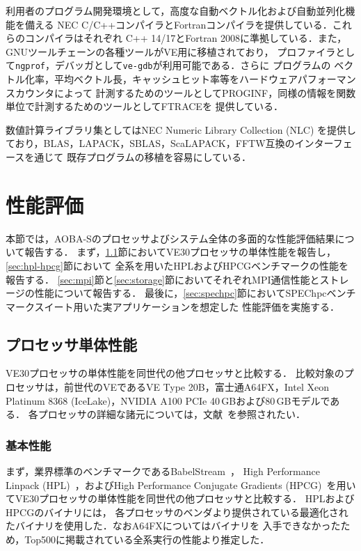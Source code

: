 ﻿\documentclass[submit,techrep,noauthor]{ipsj}
\begin{document}
利用者のプログラム開発環境として，高度な自動ベクトル化および自動並列化機能を備える
NEC C/C++コンパイラとFortranコンパイラを提供している．これらのコンパイラはそれぞれ
C++ 14/17とFortran 2008に準拠している．また，GNUツールチェーンの各種ツールがVE用に移植されており，
プロファイラとして\verb|ngprof|，デバッガとして\verb|ve-gdb|が利用可能である．さらに
プログラムの
ベクトル化率，平均ベクトル長，キャッシュヒット率等をハードウェアパフォーマンスカウンタによって
計測するためのツールとしてPROGINF，同様の情報を関数単位で計測するためのツールとしてFTRACEを
提供している．

数値計算ライブラリ集としてはNEC Numeric Library Collection
(NLC) を提供しており，BLAS，LAPACK，SBLAS，ScaLAPACK，FFTW互換のインターフェースを通じて
既存プログラムの移植を容易にしている．

\section{性能評価}

本節では，AOBA-Sのプロセッサよびシステム全体の多面的な性能評価結果について報告する．
まず，\ref{sec:proc}節においてVE30プロセッサの単体性能を報告し，\ref{sec:hpl-hpcg}節において
全系を用いたHPLおよびHPCGベンチマークの性能を報告する．
\ref{sec:mpi}節と\ref{sec:storage}節においてそれぞれMPI通信性能とストレージの性能について報告する．
最後に，\ref{sec:spechpc}節においてSPEChpcベンチマークスイート用いた実アプリケーションを想定した
性能評価を実施する．

\subsection{プロセッサ単体性能}\label{sec:proc}

VE30プロセッサの単体性能を同世代の他プロセッサと比較する．
比較対象のプロセッサは，前世代のVEであるVE Type 20B，富士通A64FX，Intel Xeon Platinum 8368
(IceLake)，NVIDIA A100 PCIe 40\,GBおよび80\,GBモデルである．
各プロセッサの詳細な諸元については，文献~\cite{Takahashi2023}を参照されたい．

\subsubsection{基本性能}

まず，業界標準のベンチマークであるBabelStream~\cite{Deakin2018}，
High Performance Linpack (HPL)~\cite{Dongarra2003}，およびHigh Performance Conjugate
Gradients (HPCG)~\cite{Dongarra2016}を用いてVE30プロセッサの単体性能を同世代の他プロセッサと比較する．
HPLおよびHPCGのバイナリには，
各プロセッサのベンダより提供されている最適化されたバイナリを使用した．なおA64FXについてはバイナリを
入手できなかったため，Top500に掲載されている全系実行の性能より推定した．
\end{document}
